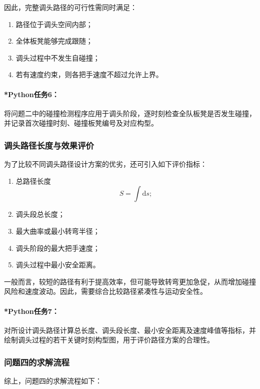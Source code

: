 \documentclass[12pt,a4paper]{ctexart}
\newcommand{\dif}{\mathrm{d}}
\begin{document}
因此，完整调头路径的可行性需同时满足：

\begin{enumerate}
    \item 路径位于调头空间内部；
    \item 全体板凳能够完成跟随；
    \item 调头过程中不发生自碰撞；
    \item 若有速度约束，则各把手速度不超过允许上界。
\end{enumerate}

\paragraph{*Python任务6：}
将问题二中的碰撞检测程序应用于调头阶段，逐时刻检查全队板凳是否发生碰撞，并记录首次碰撞时刻、碰撞板凳编号及对应构型。

\subsubsection{调头路径长度与效果评价}
为了比较不同调头路径设计方案的优劣，还可引入如下评价指标：

\begin{enumerate}
    \item 总路径长度
    \begin{equation}
    S=\int \dif s;
    \end{equation}
    \item 调头段总长度；
    \item 最大曲率或最小转弯半径；
    \item 调头阶段的最大把手速度；
    \item 调头过程中最小安全距离。
\end{enumerate}

一般而言，较短的路径有利于提高效率，但可能导致转弯更加急促，从而增加碰撞风险和速度波动。因此，需要综合比较路径紧凑性与运动安全性。

\paragraph{*Python任务7：}
对所设计调头路径计算总长度、调头段长度、最小安全距离及速度峰值等指标，并绘制调头过程的若干关键时刻构型图，用于评价路径方案的合理性。

\subsubsection{问题四的求解流程}
综上，问题四的求解流程如下：
\end{document}
